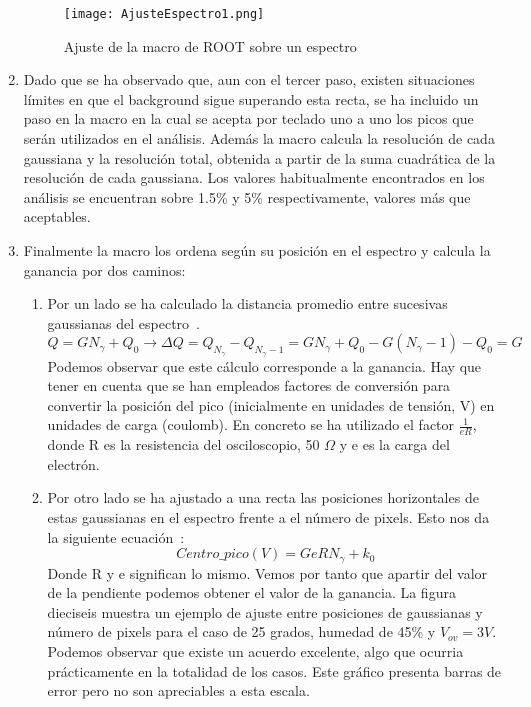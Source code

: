 \begin{enumerate}
\begin{figure}[hbtp]
\centering
\texttt{[image: AjusteEspectro1.png]}
\caption{ Ajuste de la macro de ROOT sobre un espectro}
\end{figure}

\item {} Dado que se ha observado que, aun con el tercer paso, existen situaciones límites en que el background sigue superando esta recta, se ha incluido un paso en la macro en la cual se acepta por teclado uno a uno los picos que serán utilizados en el análisis. Además la macro calcula la resolución de cada gaussiana y la resolución total, obtenida a partir de la suma cuadrática de la resolución de cada gaussiana. Los valores habitualmente encontrados en los análisis se encuentran sobre 1.5\% y 5\% respectivamente, valores más que aceptables.

\item {} Finalmente la macro los ordena según su posición en el espectro y calcula la ganancia por dos caminos:
	\begin{enumerate}

	\item {} Por un lado se ha calculado la distancia promedio entre sucesivas gaussianas del espectro~\cite{Hueso}.
	\begin{equation} 
	Q = G N_\gamma + Q_0 \longrightarrow \Delta Q= Q_{N_\gamma} - Q_{N_\gamma -1}=G N_\gamma+ Q_0 - G(N_		\gamma -1) - Q_0 = G
	\label{gananciametodo1}
	\end{equation}
	Podemos observar que este cálculo corresponde a la ganancia. Hay que tener en cuenta que se han empleados factores de conversión para convertir la posición del pico (inicialmente en unidades de	tensión, V) en unidades de carga (coulomb). En concreto se ha utilizado el factor $\frac{1}{eR}$, donde R es la resistencia del osciloscopio, 50 $\Omega$ y e es la carga del electrón.
	
	\item {} Por otro lado se ha ajustado a una recta las posiciones horizontales de estas gaussianas en el 	espectro frente a el número de pixels. Esto nos da la siguiente ecuación~\cite{Hueso}:
	\begin{equation}
	Centro\_pico(V) = GeRN_\gamma + k_0
	\label{gananciametodo2}
	\end{equation}
	Donde R y e significan lo mismo. Vemos por tanto que apartir del valor de la pendiente podemos obtener	el valor de la ganancia. La figura dieciseis muestra un ejemplo de ajuste entre posiciones de gaussianas y número de pixels para el caso de 25 grados, humedad de 45\% y $V_{ov}=3V$. Podemos observar que existe	un acuerdo excelente, algo que ocurria prácticamente en la totalidad de los casos. Este gráfico presenta barras de error pero no son apreciables a esta escala.
		

\end{enumerate}
\end{enumerate}
